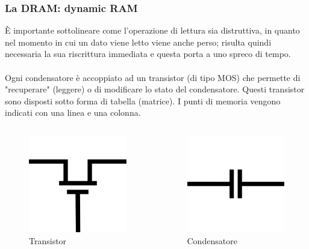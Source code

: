 \begin{frame}
	\frametitle{La DRAM: dynamic RAM}
	  
	\begin{block}{}
		È importante sottolineare come l'operazione di lettura sia distruttiva, in quanto nel momento in cui un dato viene letto viene anche perso; risulta quindi necessaria la sua riscrittura immediata e questa porta a uno spreco di tempo.\\~\\
		Ogni condensatore è accoppiato ad un transistor (di tipo MOS) che permette di "recuperare" (leggere) o di modificare lo stato del condensatore. Questi transistor sono disposti sotto forma di tabella (matrice). I punti di memoria vengono indicati con una linea e una colonna.
	\end{block}
	
	\begin{columns}			
		\begin{figure}[!htbp]
			\centering 
			\includegraphics[width=0.15\linewidth]{images/5_memory/transistor.pdf}
				\caption{Transistor}
		\end{figure}
		
		\begin{figure}[!htbp]
			\centering 
			\includegraphics[width=0.15\linewidth]{images/5_memory/condensatore.pdf}
				\caption{Condensatore} 
		\end{figure}
	\end{columns}
\end{frame}


